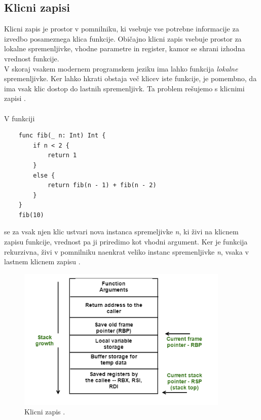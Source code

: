 \documentclass[a4paper, 12p]{book}
\begin{document}
\subsection{Klicni zapisi}

Klicni zapis je prostor v pomnilniku, ki vsebuje vse potrebne informacije za izvedbo posameznega klica funkcije. Običajno klicni zapis vsebuje prostor za lokalne spremenljivke, vhodne parametre in register, kamor se shrani izhodna vrednost funkcije. \\
\indent V skoraj vsakem modernem programskem jeziku ima lahko funkcija \textit{lokalne} spremenljivke. Ker lahko hkrati obstaja več klicev iste funkcije, je pomembno, da ima vsak klic dostop do lastnih spremenljivk. Ta problem rešujemo s klicnimi zapisi \cite{modernCompiler}.  \\\\
\indent V funkciji 

\renewcommand{\lstlistingname}{Program}
\begin{lstlisting}
	func fib(_ n: Int) Int {
	    if n < 2 {
	        return 1
	    }
	    else {
	        return fib(n - 1) + fib(n - 2)
	    }
	}
	fib(10)
\end{lstlisting}

se za vsak njen klic ustvari nova instanca spremeljivke \textit{n}, ki živi na klicnem zapisu funkcije, vrednost pa ji priredimo kot vhodni argument. Ker je funkcija rekurzivna, živi v pomnilniku naenkrat veliko instanc spremenljivke \textit{n}, vsaka v lastnem klicnem zapisu \cite{modernCompiler}.

\begin{figure}[h]
	\begin{center}
		\includegraphics[width=0.9\textwidth]{resources/stackFrame.png}
	\end{center}
	\caption{Klicni zapis \cite{stackFrames}.}
	\label{image:stackFramesImg}
\end{figure}
\end{document}

